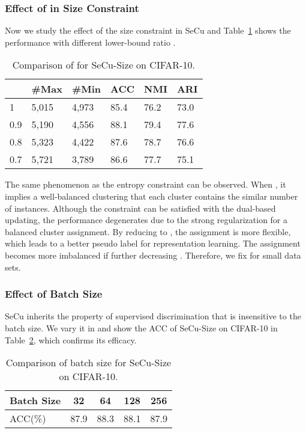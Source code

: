 \documentclass[10pt,twocolumn,letterpaper]{article}
\begin{document}
\subsubsection{Effect of  in Size Constraint}
Now we study the effect of the size constraint in SeCu and Table~\ref{ta:gamma} shows the performance with different lower-bound ratio . 

\begin{table}[!ht]
\centering
\begin{tabular}{|l|l|l|l|l|l|}\hline
&\#Max&\#Min&ACC&NMI&ARI\\\hline
1&5,015&4,973&85.4&76.2&73.0\\
0.9&5,190&4,556&88.1&79.4&77.6\\
0.8&5,323&4,422&87.6&78.7&76.6\\
0.7&5,721&3,789&86.6&77.7&75.1\\\hline
\end{tabular}
\caption{Comparison of  for SeCu-Size on CIFAR-10. }\label{ta:gamma}
\end{table}

The same phenomenon as the entropy constraint can be observed. When , it implies a well-balanced clustering that each cluster contains the similar number of instances. Although the constraint can be satisfied with the dual-based updating, the performance degenerates due to the strong regularization for a balanced cluster assignment. By reducing  to , the assignment is more flexible, which leads to a better pseudo label for representation learning. The assignment becomes more imbalanced if further decreasing . Therefore, we fix  for small data sets.



\subsubsection{Effect of Batch Size}

SeCu inherits the property of supervised discrimination that is insensitive to the batch size. We vary it in  and show the ACC of SeCu-Size on CIFAR-10 in Table~\ref{ta:bsize}, which confirms its efficacy.

\begin{table}[!ht]
\centering
\begin{tabular}{|l|c|c|c|c|}\hline
Batch Size&32&64&128&256\\\hline
ACC(\%)&87.9&88.3&88.1&87.9\\\hline
\end{tabular}
\caption{Comparison of batch size for SeCu-Size on CIFAR-10. }\label{ta:bsize}
\end{table}
\end{document}
